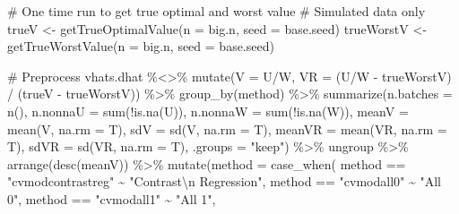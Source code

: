 \documentclass[
  letterpaper,
  DIV=11,
  numbers=noendperiod]{scrreprt}
\newenvironment{Shaded}{\begin{snugshade}}{\end{snugshade}}
\newcommand{\AttributeTok}[1]{\textcolor[rgb]{0.40,0.45,0.13}{#1}}
\newcommand{\CommentTok}[1]{\textcolor[rgb]{0.37,0.37,0.37}{#1}}
\newcommand{\FunctionTok}[1]{\textcolor[rgb]{0.28,0.35,0.67}{#1}}
\newcommand{\NormalTok}[1]{\textcolor[rgb]{0.00,0.23,0.31}{#1}}
\newcommand{\OtherTok}[1]{\textcolor[rgb]{0.00,0.23,0.31}{#1}}
\newcommand{\SpecialCharTok}[1]{\textcolor[rgb]{0.37,0.37,0.37}{#1}}
\newcommand{\StringTok}[1]{\textcolor[rgb]{0.13,0.47,0.30}{#1}}
\begin{document}
\begin{Shaded}
\begin{Highlighting}[]
\CommentTok{\# One time run to get true optimal and worst value}
\CommentTok{\# Simulated data only}
\NormalTok{trueV }\OtherTok{\textless{}{-}} \FunctionTok{getTrueOptimalValue}\NormalTok{(}\AttributeTok{n =}\NormalTok{ big.n, }\AttributeTok{seed =}\NormalTok{ base.seed)}
\NormalTok{trueWorstV }\OtherTok{\textless{}{-}} \FunctionTok{getTrueWorstValue}\NormalTok{(}\AttributeTok{n =}\NormalTok{ big.n, }\AttributeTok{seed =}\NormalTok{ base.seed)}

\CommentTok{\# Preprocess}
\NormalTok{vhats.dhat }\SpecialCharTok{\%\textless{}\textgreater{}\%}
  \FunctionTok{mutate}\NormalTok{(}\AttributeTok{V =}\NormalTok{ U}\SpecialCharTok{/}\NormalTok{W,}
         \AttributeTok{VR =}\NormalTok{ (U}\SpecialCharTok{/}\NormalTok{W }\SpecialCharTok{{-}}\NormalTok{ trueWorstV) }\SpecialCharTok{/}\NormalTok{ (trueV }\SpecialCharTok{{-}}\NormalTok{ trueWorstV)) }\SpecialCharTok{\%\textgreater{}\%}
  \FunctionTok{group\_by}\NormalTok{(method) }\SpecialCharTok{\%\textgreater{}\%}
  \FunctionTok{summarize}\NormalTok{(}\AttributeTok{n.batches =} \FunctionTok{n}\NormalTok{(),}
            \AttributeTok{n.nonnaU =} \FunctionTok{sum}\NormalTok{(}\SpecialCharTok{!}\FunctionTok{is.na}\NormalTok{(U)),}
            \AttributeTok{n.nonnaW =} \FunctionTok{sum}\NormalTok{(}\SpecialCharTok{!}\FunctionTok{is.na}\NormalTok{(W)),}
            \AttributeTok{meanV =} \FunctionTok{mean}\NormalTok{(V, }\AttributeTok{na.rm =}\NormalTok{ T),}
            \AttributeTok{sdV =} \FunctionTok{sd}\NormalTok{(V, }\AttributeTok{na.rm =}\NormalTok{ T),}
            \AttributeTok{meanVR =} \FunctionTok{mean}\NormalTok{(VR, }\AttributeTok{na.rm =}\NormalTok{ T),}
            \AttributeTok{sdVR =} \FunctionTok{sd}\NormalTok{(VR, }\AttributeTok{na.rm =}\NormalTok{ T),}
            \AttributeTok{.groups =} \StringTok{"keep"}\NormalTok{) }\SpecialCharTok{\%\textgreater{}\%}
\NormalTok{  ungroup }\SpecialCharTok{\%\textgreater{}\%}
  \FunctionTok{arrange}\NormalTok{(}\FunctionTok{desc}\NormalTok{(meanV)) }\SpecialCharTok{\%\textgreater{}\%}
  \FunctionTok{mutate}\NormalTok{(}\AttributeTok{method =} \FunctionTok{case\_when}\NormalTok{(}
\NormalTok{    method }\SpecialCharTok{==} \StringTok{"cvmodcontrastreg"} \SpecialCharTok{\textasciitilde{}} \StringTok{"Contrast}\SpecialCharTok{\textbackslash{}n}\StringTok{ Regression"}\NormalTok{,}
\NormalTok{    method }\SpecialCharTok{==} \StringTok{"cvmodall0"} \SpecialCharTok{\textasciitilde{}} \StringTok{"All 0"}\NormalTok{,}
\NormalTok{    method }\SpecialCharTok{==} \StringTok{"cvmodall1"} \SpecialCharTok{\textasciitilde{}} \StringTok{"All 1"}\NormalTok{,}

\end{Highlighting}
\end{Shaded}
\end{document}
